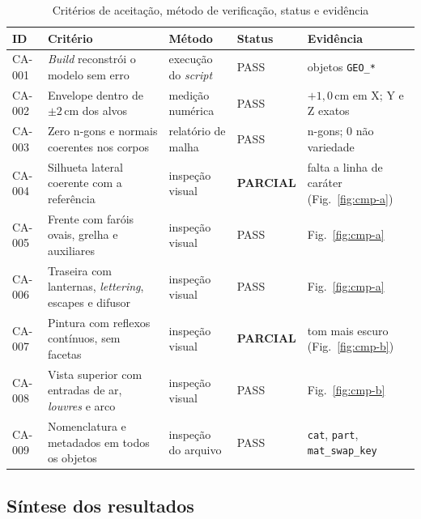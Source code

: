 \begin{table}[htbp]
\centering
\caption{Crit\'erios de aceita\c{c}\~ao, m\'etodo de verifica\c{c}\~ao, status e evid\^encia}
\label{tab:crit}
\footnotesize
\begin{tabular}{>{\raggedright\arraybackslash}p{1.0cm}>{\raggedright\arraybackslash}p{3.9cm}>{\raggedright\arraybackslash}p{2.9cm}>{\raggedright\arraybackslash}p{1.75cm}>{\raggedright\arraybackslash}p{3.85cm}}
\toprule
\textbf{ID} & \textbf{Crit\'erio} & \textbf{M\'etodo} & \textbf{Status} & \textbf{Evid\^encia} \\
\midrule
CA-001 & \emph{Build} reconstr\'oi o modelo sem erro & execu\c{c}\~ao do \emph{script} & PASS & 130 objetos \texttt{GEO\_*} \\
CA-002 & Envelope dentro de $\pm2$\,cm dos alvos & medi\c{c}\~ao num\'erica & PASS & $+1{,}0$\,cm em X; Y e Z exatos \\
CA-003 & Zero n-gons e normais coerentes nos corpos & relat\'orio de malha & PASS & 0 n-gons; 0 n\~ao variedade \\
CA-004 & Silhueta lateral coerente com a refer\^encia & inspe\c{c}\~ao visual & \textbf{PARCIAL} & falta a linha de car\'ater (Fig.~\ref{fig:cmp-a}) \\
CA-005 & Frente com far\'ois ovais, grelha e auxiliares & inspe\c{c}\~ao visual & PASS & Fig.~\ref{fig:cmp-a} \\
CA-006 & Traseira com lanternas, \emph{lettering}, escapes e difusor & inspe\c{c}\~ao visual & PASS & Fig.~\ref{fig:cmp-a} \\
CA-007 & Pintura com reflexos cont\'inuos, sem facetas & inspe\c{c}\~ao visual & \textbf{PARCIAL} & tom mais escuro (Fig.~\ref{fig:cmp-b}) \\
CA-008 & Vista superior com entradas de ar, \emph{louvres} e arco & inspe\c{c}\~ao visual & PASS & Fig.~\ref{fig:cmp-b} \\
CA-009 & Nomenclatura e metadados em todos os objetos & inspe\c{c}\~ao do arquivo & PASS & \texttt{cat}, \texttt{part}, \texttt{mat\_swap\_key} \\
\bottomrule
\end{tabular}
\end{table}

\subsection{S\'intese dos resultados}

